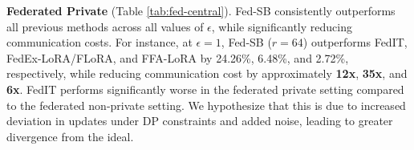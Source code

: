 \textbf{Federated Private} (Table \ref{tab:fed-central}).
Fed-SB consistently outperforms all previous methods across all values of $\epsilon$, while significantly reducing communication costs. 
For instance, at $\epsilon=1$, Fed-SB ($r=64$) outperforms FedIT, FedEx-LoRA/FLoRA, and FFA-LoRA by 24.26\%, 6.48\%, and 2.72\%, respectively, while reducing communication cost by approximately \textbf{12x}, \textbf{35x}, and \textbf{6x}.
FedIT performs significantly worse in the federated private setting compared to the federated non-private setting. 
We hypothesize that this is due to increased deviation in updates under DP constraints and added noise, leading to greater divergence from the ideal.



